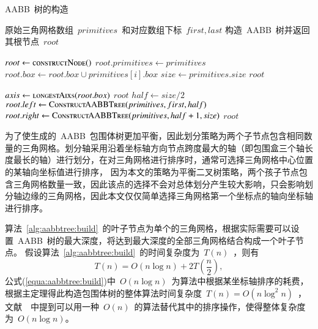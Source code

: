 \begin{algorithm}[htbp]
\small
\caption{AABB~树的构造}
\label{alg:aabbtree:build}
\begin{algorithmic}[1]
\Require
原始三角网格数组~$primitives$~和对应数组下标~$first, last$
\Ensure
构造~AABB~树并返回其根节点~$root$

  \State $root \gets \Call{constructNode()}{}$ 
  \State $root.primitives \gets primitives$
      \State $root.box \gets root.box \cup primitives[i].box$
  \EndFor
  \State $size \gets primitives.size$  
  \State \Return $root$
  \EndIf

  \State $axis \gets \Call{longestAixs}{root.box}$
      \State \Return $root$
  \EndIf
  \State $half \gets size / 2 $
  \State $root.left \gets \Call{ConstructAABBTree}{primitives, first, half}$
  \State {}
  \State $root.right \gets \Call{ConstructAABBTree}{primitives, half+1, size}$ 
  \State \Return $root$
\EndFunction
\end{algorithmic}
\end{algorithm}

为了使生成的~AABB~包围体树更加平衡，因此划分策略为两个子节点包含相同数量的三角网格。划分轴采用沿着坐标轴方向节点跨度最大的轴（即包围盒三个轴长度最长的轴）进行划分，在对三角网格进行排序时，通常可选择三角网格中心位置的某轴向坐标值进行排序，
因为本文的策略为平衡二叉树策略，两个孩子节点包含三角网格数量一致，因此该点的选择不会对总体划分产生较大影响，只会影响划分轴边缘的三角网格，因此本文仅仅简单选择三角网格第一个坐标点的轴向坐标轴进行排序。

算法~\ref{alg:aabbtree:build}~的叶子节点为单个的三角网格，根据实际需要可以设置~AABB~树的最大深度，将达到最大深度的全部三角网格结合构成一个叶子节点。
假设算法~\ref{alg:aabbtree:build}~的时间复杂度为~$T(n)$~，则有
\begin{equation}
  T(n) = O(n \log n ) + 2T(\frac{n}{2}),
\label{equa:aabbtree:build}
\end{equation}
公式(\ref{equa:aabbtree:build})中~$O(n \log n)$~为算法中根据某坐标轴排序的耗费，根据主定理得此构造包围体树的整体算法时间复杂度~$T(n)=O(n\log^2n)$~，文献~~中提到可以用一种~$O(n)$~的算法替代其中的排序操作，使得整体复杂度为~$O(n\log n)$。

